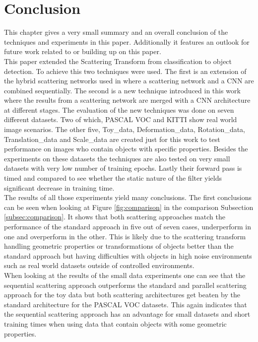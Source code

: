 \chapter{Conclusion}
\label{chap:conclusion}

This chapter gives a very small summary and an overall conclusion of the techniques and experiments in this paper. Additionally it features an outlook for future work related to or building up on this paper. \\
This paper extended the Scattering Transform from classification to object detection. To achieve this two techniques were used. The first is an extension of the hybrid scattering networks used in \cite{ScalingTheScatteringTransform2017} where a scattering network and a CNN are combined sequentially. The second is a new technique introduced in this work where the results from a scattering network are merged with a CNN architecture at different stages. The evaluation of the new techniques was done on seven different datasets. Two of which, PASCAL VOC and KITTI show real world image scenarios. The other five, Toy\_data, Deformation\_data, Rotation\_data, Translation\_data and Scale\_data are created just for this work to test performance on images who contain objects with specific properties. Besides the experiments on these datasets the techniques are also tested on very small datasets with very low number of training epochs. Lastly their forward pass is timed and compared to see whether the static nature of the filter yields significant decrease in training time. \\
The results of all those experiments yield many conclusions. The first conclusions can be seen when looking at Figure \ref{fig:comparison} in the comparison Subsection \ref{subsec:comparison}. It shows that both scattering approaches match the performance of the standard approach in five out of seven cases, underperform in one and overperform in the other. This is likely due to the scattering transform handling geometric properties or transformations of objects better than the standard approach but having difficulties with objects in high noise environments such as real world datasets outside of controlled environments. \\
When looking at the results of the small data experiments one can see that the sequential scattering approach outperforms the standard and parallel scattering approach for the toy data but both scattering architectures get beaten by the standard architecture for the PASCAL VOC datasets. This again indicates that the sequential scattering approach has an advantage for small datasets and short training times when using data that contain objects with some geometric properties. \\
